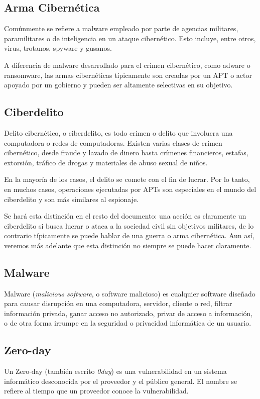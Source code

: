 \documentclass{article}
\begin{document}
\subsection{Arma Cibernética}
Comúnmente se refiere a malware empleado por parte de agencias militares, paramilitares o de inteligencia en un ataque cibernético. Esto incluye, entre otros, virus, trotanos, spyware y gusanos.

A diferencia de malware desarrollado para el crimen cibernético, como adware o ransomware, las armas cibernéticas típicamente son creadas por un APT o actor apoyado por un gobierno y pueden ser altamente selectivas en su objetivo. \autocite{stevens-cyberweapons}

\subsection{Ciberdelito}
Delito cibernético, o ciberdelito, es todo crimen o delito que involucra una computadora o redes de computadoras. Existen varias clases de crimen cibernético, desde fraude y lavado de dinero hasta crímenes financieros, estafas, extorsión, tráfico de drogas y materiales de abuso sexual de niños.

En la mayoría de los casos, el delito se comete con el fin de lucrar. Por lo tanto, en muchos casos, operaciones ejecutadas por APTs son especiales en el mundo del ciberdelito y son más similares al espionaje.

Se hará esta distinción en el resto del documento: una acción es claramente un ciberdelito si busca lucrar o ataca a la sociedad civil sin objetivos militares, de lo contrario típicamente se puede hablar de una guerra o arma cibernética. Aun así, veremos más adelante que esta distinción no siempre se puede hacer claramente. \autocite{cybercrime-britannica}

\subsection{Malware}
Malware ({\it malicious software}, o software malicioso) es cualquier software diseñado para causar disrupción en una computadora, servidor, cliente o red, filtrar información privada, ganar acceso no autorizado, privar de acceso a información, o de otra forma irrumpe en la seguridad o privacidad informática de un usuario. \autocite{tahir-malware}

\subsection{Zero-day}
Un Zero-day (también escrito {\it 0day}) es una vulnerabilidad en un sistema informático desconocida por el proveedor y el público general. El nombre se refiere al tiempo que un proveedor conoce la vulnerabilidad.
\end{document}
